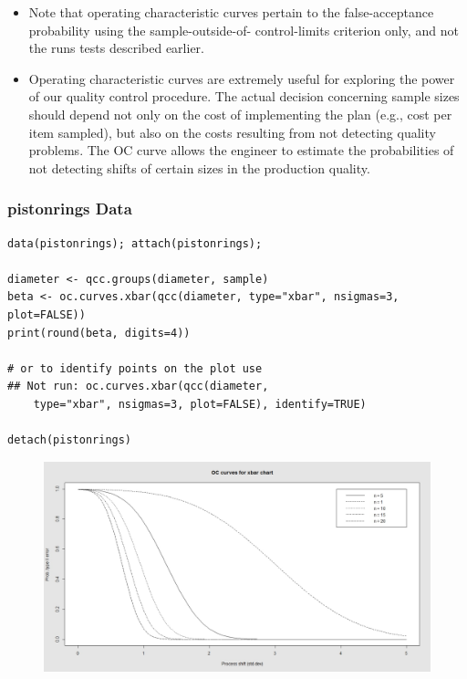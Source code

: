 \documentclass[]{report}
\begin{document}
\begin{itemize}
\item Note that operating characteristic curves pertain to the false-acceptance probability using the sample-outside-of- control-limits criterion only, and not the runs tests described earlier.


\item Operating characteristic curves are extremely useful for exploring the power of our quality control procedure. The actual decision concerning sample sizes should depend not only on the cost of implementing the plan (e.g., cost per item sampled), but also on the costs resulting from not detecting quality problems. The OC curve allows the engineer to estimate the probabilities of not detecting shifts of certain sizes in the production quality.
\end{itemize}






\newpage
\subsubsection{pistonrings Data}
\begin{framed}
\begin{verbatim}
data(pistonrings); attach(pistonrings);

diameter <- qcc.groups(diameter, sample)
beta <- oc.curves.xbar(qcc(diameter, type="xbar", nsigmas=3, plot=FALSE))
print(round(beta, digits=4))

# or to identify points on the plot use
## Not run: oc.curves.xbar(qcc(diameter, 
    type="xbar", nsigmas=3, plot=FALSE), identify=TRUE)

detach(pistonrings)
\end{verbatim}
\end{framed}

\begin{figure}
\centering
\includegraphics[width=0.7\linewidth]{images/OCpistonrings}
\caption{}
\label{fig:OCpistonrings}
\end{figure}
\end{document}
